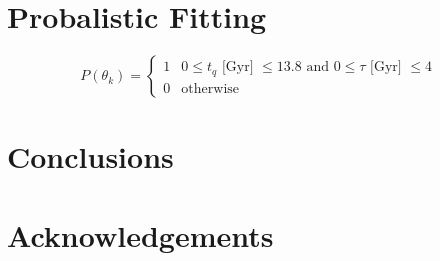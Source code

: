 \documentclass[a4paper,fleqn,usenatbib]{mnras}
\begin{document}
\section{Probalistic Fitting}

   

   \begin{equation}
      P(\theta_{k}) = \begin{cases}
                       1 & 0\leq t_{q}\text{ [Gyr] } \leq 13.8 \text{ and }  0 \leq \tau\text{ [Gyr] } \leq 4 \\
                       0 & \text{otherwise}
                      \end{cases}
      \label{eq:prior}
   \end{equation}

\section{Conclusions}

\section*{Acknowledgements}










\appendix




\bsp	%
\label{lastpage}
\end{document}
